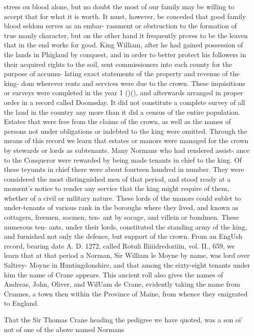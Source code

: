 \documentclass[oneside]{book}
\begin{document}
stress ou blood alone, but no doubt the most of our family may 
be willing to accept that for what it is worth. It must, however, 
be conceded that good family blood seldom serves as an embar- 
rassment or obstruction to the formation of true manly character, 
but on the other hand it frequently proves to be the leaven that in 
the end works for good. King William, after he had gained 
possession of the lands in Phiglaud by conquest, and in order to 
better protect his followers in their acquired rights to the soil, 
sent commissioners into each county for the purpose of accumu- 
lating exact statements of the property and revenue of the king- 
dom wherever rents and services were due to the crown. These 
inquisitions or surveys were completed in the year 1 ()(), and 
afterwards arranged in proper order in a record called Doomsday. 
It did not constitute a complete survey of all the land in the 
country any more than it did a census of the entire population. 
Estates that were free from the claims of the crown, as well as 
the names of persons not under obligations or indebted to the 
king were omitted. Through the means of this record we learn 
that estates or manors were managed for the crown by stewards 
or lords as subtenants. Many Normans who had rendered assist- 
ance to the Conqueror were rewarded by being made tenants in 
chief to the king. Of these teyumts in chief there were about 
fourteen hundred in number. They were considered the most 
distinguished men of that period, and stood ready at a moment's 
notice to render any service that the king might require of them, 
whether of a civil or military nature. These lords of the manors 
could sublet to under-tenants of various rank in the boroughs 
where they lived, and known as cottagers, freemen, socmen, ten- 
ant by socage, and villein or bondmen. These numerous ten- 
ants, under their lords, constituted the standing army of the 
king, and furnished not only the defence, but support of the 
crown. From an EngUsh record, bearing date A. D. 1272, called 
Rotuli Iliiiidredoriiin, vol. II., 659, we learn that at that period a 
Norman, Sir William le Moyne by name, was lord over Saltrey- 
Moyne in Huntingdonshire, and that among the sixty-eight tenants 
under him the name of Crane appears. This ancient roll also 
gives the names of Andreas, John, Oliver, and WilUam de Crane, 
evidently taking the name from Crannes, a town then within the 
Province of Maine, from whence they emigrated to England. 

That the Sir Thomas Crane heading the pedigree we have 
quoted, was a son oi' not of one of the above named Normans 
\end{document}
